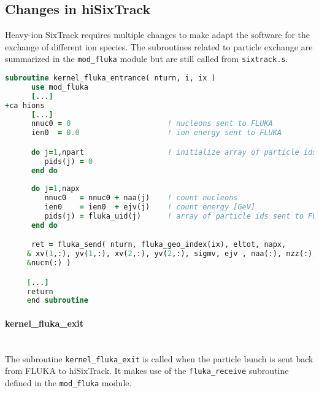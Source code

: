 \subsection{Changes in hiSixTrack}
Heavy-ion SixTrack requires multiple changes to make adapt the software for the exchange of different ion species. The subroutines related to particle exchange are summarized in the \texttt{mod\_fluka} module but are still called from \texttt{sixtrack.s}. 

\vspace{0.5cm}
\begin{minipage}{\linewidth}
\begin{lstlisting}[language=Fortran,caption=Send particles to FLUKA as implemented in hiSixTrack.,label=lst:coupling_send]
      subroutine kernel_fluka_entrance( nturn, i, ix )
      use mod_fluka
      [...]
+ca hions
      [...]	
      nnuc0 = 0                      ! nucleons sent to FLUKA
      ien0  = 0.0                    ! ion energy sent to FLUKA

      do j=1,npart                   ! initialize array of particle ids 
         pids(j) = 0
      end do
	
      do j=1,napx                    
         nnuc0   = nnuc0 + naa(j)    ! count nucleons
         ien0    = ien0  + ejv(j)    ! count energy [GeV]
         pids(j) = fluka_uid(j)      ! array of particle ids sent to FLUKA
      end do

      ret = fluka_send( nturn, fluka_geo_index(ix), eltot, napx,        &
     & xv(1,:), yv(1,:), xv(2,:), yv(2,:), sigmv, ejv , naa(:), nzz(:), &
     &nucm(:) ) 

     [...]
     return
     end subroutine
\end{lstlisting}
\end{minipage}

\paragraph{kernel\_fluka\_exit}
\mbox{} \\
The subroutine \texttt{kernel\_fluka\_exit} is called when the particle bunch is sent back from FLUKA to hiSixTrack. It makes use of the \texttt{fluka\_receive} subroutine defined in the \texttt{mod\_fluka} module.

